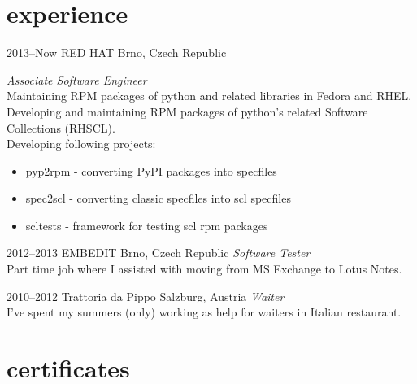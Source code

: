 \documentclass[]{friggeri-cv} %
\begin{document}

\section{experience}


\begin{entrylist}


\entry
{2013--Now}
{RED HAT}
{Brno, Czech Republic}
{\emph{Associate Software Engineer} \\ Maintaining RPM packages of python and related libraries 
in Fedora and RHEL.\\ Developing and maintaining RPM packages of python's related Software 
Collections (RHSCL). \\ Developing following projects:
\begin{itemize}
\item pyp2rpm - converting PyPI packages into specfiles
\item spec2scl - converting classic specfiles into scl specfiles
\item scltests - framework for testing scl rpm packages
\end{itemize}}


\entry
{2012--2013}
{EMBEDIT}
{Brno, Czech Republic}
{\emph{Software Tester} \\ Part time job where I assisted with moving from MS Exchange to Lotus Notes.}

\entry
{2010--2012}
{Trattoria da Pippo}
{Salzburg, Austria}
{\emph{Waiter} \\ I've spent my summers (only) working as help for waiters in Italian restaurant.}
\end{entrylist}



\section{certificates}
\end{document}
